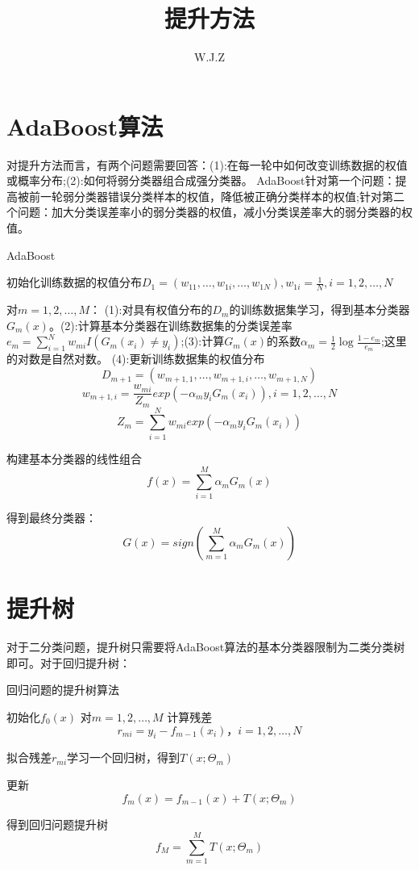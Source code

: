 \documentclass{report}
\title{提升方法}
\author{W.J.Z}
\date{}
\begin{document}
	\maketitle
	\section{AdaBoost算法}
	对提升方法而言，有两个问题需要回答：(1):在每一轮中如何改变训练数据的权值或概率分布;(2):如何将弱分类器组合成强分类器。
	AdaBoost针对第一个问题：提高被前一轮弱分类器错误分类样本的权值，降低被正确分类样本的权值;针对第二个问题：加大分类误差率小的弱分类器的权值，减小分类误差率大的弱分类器的权值。
	
	\begin{algorithm}[h]
		\caption{AdaBoost}
		\LinesNumbered
		
		初始化训练数据的权值分布$D_{1}=\left ( w_{11},\ldots,w_{1i},\ldots,w_{1N} \right ),w_{1i}=\frac{1}{N},i=1,2,\ldots,N$
		
		对$m=1,2,\ldots,M$：
		(1):对具有权值分布的$D_{m}$的训练数据集学习，得到基本分类器$G_{m}(x)$。(2):计算基本分类器在训练数据集的分类误差率$e_{m}=\sum_{i=1}^{N}w_{mi}I\left ( G_{m}\left ( x_{i} \right ) \neq y_{i} \right )$;(3):计算$G_{m}(x)$的系数$\alpha _{m}=\frac{1}{2}\log \frac{1-e_{m}}{e_{m}}$;这里的对数是自然对数。
		(4):更新训练数据集的权值分布$$D_{m+1} = (w_{m+1,1},\ldots,w_{m+1,i},\ldots,w_{m+1,N})$$ $$w_{m+1,i}=\frac{w_{mi}}{Z_{m}}exp\left ( -\alpha _{m}y_{i}G_{m}\left ( x_{i} \right ) \right ),i=1,2,\ldots,N$$  $$Z_{m}=\sum_{i=1}^{N}w_{mi}exp\left ( -\alpha _{m}y_{i}G_{m}\left ( x_{i} \right ) \right )$$
		
		构建基本分类器的线性组合$$f\left ( x \right )=\sum_{i=1}^{M}\alpha _{m}G_{m}\left ( x \right )$$
		
		得到最终分类器：
		$$G\left ( x \right )=sign\left ( \sum_{m=1}^{M}\alpha _{m}G_{m}\left ( x \right ) \right )$$
	\end{algorithm}

	\section{提升树}
	对于二分类问题，提升树只需要将AdaBoost算法的基本分类器限制为二类分类树即可。对于回归提升树：
	\begin{algorithm}[h]
		\caption{回归问题的提升树算法}
		\LinesNumbered
		初始化$f_{0}(x)$
		对$m=1,2,\ldots,M$
		计算残差$$r_{mi}=y_{i}-f_{m-1}(x_{i})，i=1,2,\ldots,N$$
		
		拟合残差$r_{mi}$学习一个回归树，得到$T\left ( x;\Theta _{m} \right )$
		
		更新$$f_{m}\left ( x \right )=f_{m-1}\left ( x \right )+T\left ( x;\Theta _{m} \right )$$
		
		得到回归问题提升树
		$$f_{M}=\sum_{m=1}^{M}T\left ( x;\Theta _{m} \right )$$
	\end{algorithm}
\end{document}
